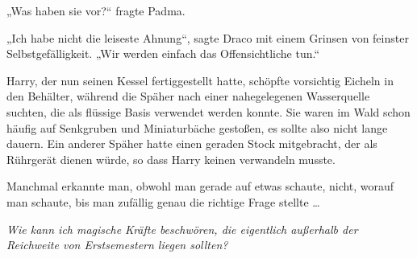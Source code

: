 „Was haben sie vor?“ fragte Padma.

„Ich habe nicht die leiseste Ahnung“, sagte Draco mit einem Grinsen von feinster Selbstgefälligkeit.
„Wir werden einfach das Offensichtliche tun.“

\later

Harry, der nun seinen Kessel fertiggestellt hatte, schöpfte vorsichtig Eicheln in den Behälter, während die Späher nach einer nahegelegenen Wasserquelle suchten, die als flüssige Basis verwendet werden konnte. Sie waren im Wald schon häufig auf Senkgruben und Miniaturbäche gestoßen, es sollte also nicht lange dauern. Ein anderer Späher hatte einen geraden Stock mitgebracht, der als Rührgerät dienen würde, so dass Harry keinen verwandeln musste.

Manchmal erkannte man, obwohl man gerade auf etwas schaute, nicht, worauf man schaute, bis man zufällig genau die richtige Frage stellte …

\emph{Wie kann ich magische Kräfte beschwören, die eigentlich außerhalb der Reichweite von Erstsemestern liegen sollten?}

